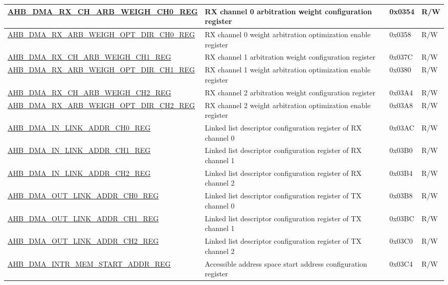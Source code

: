 \begin{longtable}{ | p{8cm} | p{8cm} | p{1.3cm} | p{1.5cm} | }
\hyperref[regdesc:AHBDMARXCHARBWEIGHCHNREG]{AHB\_DMA\_RX\_CH\_ARB\_WEIGH\_CH0\_REG} & RX channel 0 arbitration weight configuration register & 0x0354 & R/W \\ \hline
\hyperref[regdesc:AHBDMARXARBWEIGHOPTDIRCHNREG]{AHB\_DMA\_RX\_ARB\_WEIGH\_OPT\_DIR\_CH0\_REG} & RX channel 0 weight arbitration optimization enable register & 0x0358 & R/W \\ \hline
\hyperref[regdesc:AHBDMARXCHARBWEIGHCHNREG]{AHB\_DMA\_RX\_CH\_ARB\_WEIGH\_CH1\_REG} & RX channel 1 arbitration weight configuration register & 0x037C & R/W \\ \hline
\hyperref[regdesc:AHBDMARXARBWEIGHOPTDIRCHNREG]{AHB\_DMA\_RX\_ARB\_WEIGH\_OPT\_DIR\_CH1\_REG} & RX channel 1 weight arbitration optimization enable register & 0x0380 & R/W \\ \hline
\hyperref[regdesc:AHBDMARXCHARBWEIGHCHNREG]{AHB\_DMA\_RX\_CH\_ARB\_WEIGH\_CH2\_REG} & RX channel 2 arbitration weight configuration register & 0x03A4 & R/W \\ \hline
\hyperref[regdesc:AHBDMARXARBWEIGHOPTDIRCHNREG]{AHB\_DMA\_RX\_ARB\_WEIGH\_OPT\_DIR\_CH2\_REG} & RX channel 2 weight arbitration optimization enable register & 0x03A8 & R/W \\ \hline
\hyperref[regdesc:AHBDMAINLINKADDRCHNREG]{AHB\_DMA\_IN\_LINK\_ADDR\_CH0\_REG} & Linked list descriptor configuration register of RX channel 0 & 0x03AC & R/W \\ \hline
\hyperref[regdesc:AHBDMAINLINKADDRCHNREG]{AHB\_DMA\_IN\_LINK\_ADDR\_CH1\_REG} & Linked list descriptor configuration register of RX channel 1 & 0x03B0 & R/W \\ \hline
\hyperref[regdesc:AHBDMAINLINKADDRCHNREG]{AHB\_DMA\_IN\_LINK\_ADDR\_CH2\_REG} & Linked list descriptor configuration register of RX channel 2 & 0x03B4 & R/W \\ \hline
\hyperref[regdesc:AHBDMAOUTLINKADDRCHNREG]{AHB\_DMA\_OUT\_LINK\_ADDR\_CH0\_REG} & Linked list descriptor configuration register of TX channel 0 & 0x03B8 & R/W \\ \hline
\hyperref[regdesc:AHBDMAOUTLINKADDRCHNREG]{AHB\_DMA\_OUT\_LINK\_ADDR\_CH1\_REG} & Linked list descriptor configuration register of TX channel 1 & 0x03BC & R/W \\ \hline
\hyperref[regdesc:AHBDMAOUTLINKADDRCHNREG]{AHB\_DMA\_OUT\_LINK\_ADDR\_CH2\_REG} & Linked list descriptor configuration register of TX channel 2 & 0x03C0 & R/W \\ \hline
\hyperref[regdesc:AHBDMAINTRMEMSTARTADDRREG]{AHB\_DMA\_INTR\_MEM\_START\_ADDR\_REG} & Accessible address space start address configuration register & 0x03C4 & R/W \\ \hline

\end{longtable}
